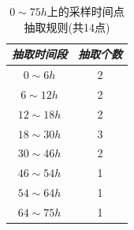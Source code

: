 \documentclass[a4paper,punct=banjiao,twoside]{ctexrep}
\theoremstyle{plain}
\theoremstyle{definition}
\theoremstyle{remark}
\begin{document}
\begin{table}[htbp]
  \centering
  \begin{tabular}[t]{c*{1}{c}}
    \hline
    \textit{抽取时间段} & \textit{抽取个数}\\
    \hline
    $0\sim 6h$&  2 \\ 
    $6\sim 12h$&  2 \\ 
    $12\sim 18h$&  2 \\ 
    $18\sim 30h$&  3 \\ 
    $30\sim 46h$&  2 \\ 
    $46\sim 54h$&  1 \\ 
    $54\sim 64h$&  1 \\ 
    $64\sim 75h$&  1 \\ 
    \hline
  \end{tabular}
  \caption{\label{tab5}$0\sim75h$上的采样时间点抽取规则(共14点)} 
\end{table}  
\end{document}

